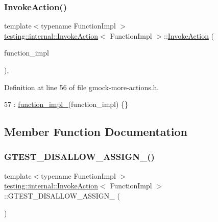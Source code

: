 \subsubsection{\texorpdfstring{Invoke\+Action()}{InvokeAction()}}
{\footnotesize\ttfamily template$<$typename Function\+Impl $>$ \\
\hyperlink{classtesting_1_1internal_1_1InvokeAction}{testing\+::internal\+::\+Invoke\+Action}$<$ Function\+Impl $>$\+::\hyperlink{classtesting_1_1internal_1_1InvokeAction}{Invoke\+Action} (\begin{DoxyParamCaption}\item[{Function\+Impl}]{function\+\_\+impl }\end{DoxyParamCaption})\hspace{0.3cm}{\ttfamily [inline]}, {\ttfamily [explicit]}}



Definition at line 56 of file gmock-\/more-\/actions.\+h.


\begin{DoxyCode}
57       : \hyperlink{classtesting_1_1internal_1_1InvokeAction_afe2a9f6157cfd9c8b369987411f53337}{function\_impl\_}(function\_impl) \{\}
\end{DoxyCode}


\subsection{Member Function Documentation}
\mbox{\label{classtesting_1_1internal_1_1InvokeAction_a7fc4b4fad2b22e50dd818db00a8d7bb9}} 
\subsubsection{\texorpdfstring{G\+T\+E\+S\+T\+\_\+\+D\+I\+S\+A\+L\+L\+O\+W\+\_\+\+A\+S\+S\+I\+G\+N\+\_\+()}{GTEST\_DISALLOW\_ASSIGN\_()}}
{\footnotesize\ttfamily template$<$typename Function\+Impl $>$ \\
\hyperlink{classtesting_1_1internal_1_1InvokeAction}{testing\+::internal\+::\+Invoke\+Action}$<$ Function\+Impl $>$\+::G\+T\+E\+S\+T\+\_\+\+D\+I\+S\+A\+L\+L\+O\+W\+\_\+\+A\+S\+S\+I\+G\+N\+\_\+ (\begin{DoxyParamCaption}\item[{\hyperlink{classtesting_1_1internal_1_1InvokeAction}{Invoke\+Action}$<$ Function\+Impl $>$}]{ }\end{DoxyParamCaption})\hspace{0.3cm}{\ttfamily [private]}}

